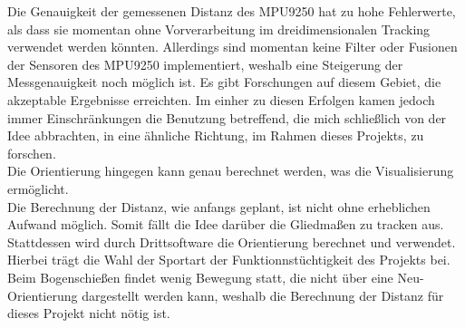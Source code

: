 Die Genauigkeit der gemessenen Distanz des MPU9250 hat zu hohe Fehlerwerte, als 
dass sie momentan ohne Vorverarbeitung im dreidimensionalen Tracking verwendet werden könnten.
Allerdings sind momentan keine Filter oder Fusionen der Sensoren des MPU9250 implementiert,
weshalb eine Steigerung der Messgenauigkeit noch möglich ist. Es gibt Forschungen auf diesem Gebiet,
die akzeptable Ergebnisse erreichten. Im einher zu diesen Erfolgen kamen jedoch immer Einschränkungen 
die Benutzung betreffend, die mich schließlich von der Idee abbrachten, in eine ähnliche Richtung, 
im Rahmen dieses Projekts, zu forschen.\\
Die Orientierung hingegen kann genau berechnet werden, was die Visualisierung ermöglicht.\\
Die Berechnung der Distanz, wie anfangs geplant, ist nicht ohne erheblichen Aufwand möglich.
Somit fällt die Idee darüber die Gliedmaßen zu tracken aus. Stattdessen wird durch Drittsoftware
die Orientierung berechnet und verwendet.\\
Hierbei trägt die Wahl der Sportart der Funktionnstüchtigkeit des Projekts bei. Beim Bogenschießen
findet wenig Bewegung statt, die nicht über eine Neu-Orientierung dargestellt werden kann, weshalb die
Berechnung der Distanz für dieses Projekt nicht nötig ist.